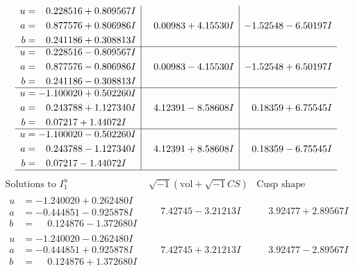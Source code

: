 \documentclass[1p]{elsarticle_modified}
\theoremstyle{definition}
\newcommand{\I}{\sqrt{-1}}
\begin{document}
$$\begin{array}{c|c|c}
\begin{aligned}
u &= \phantom{-}0.228516 + 0.809567 I \\
a &= \phantom{-}0.877576 + 0.806986 I \\
b &= \phantom{-}0.241186 + 0.308813 I\end{aligned}
 & \phantom{-}0.00983 + 4.15530 I & -1.52548 - 6.50197 I \\ \hline\begin{aligned}
u &= \phantom{-}0.228516 - 0.809567 I \\
a &= \phantom{-}0.877576 - 0.806986 I \\
b &= \phantom{-}0.241186 - 0.308813 I\end{aligned}
 & \phantom{-}0.00983 - 4.15530 I & -1.52548 + 6.50197 I \\ \hline\begin{aligned}
u &= -1.100020 + 0.502260 I \\
a &= \phantom{-}0.243788 + 1.127340 I \\
b &= \phantom{-}0.07217 + 1.44072 I\end{aligned}
 & \phantom{-}4.12391 - 8.58608 I & \phantom{-}0.18359 + 6.75545 I \\ \hline\begin{aligned}
u &= -1.100020 - 0.502260 I \\
a &= \phantom{-}0.243788 - 1.127340 I \\
b &= \phantom{-}0.07217 - 1.44072 I\end{aligned}
 & \phantom{-}4.12391 + 8.58608 I & \phantom{-}0.18359 - 6.75545 I\\
 \hline 
 \end{array}$$\newpage$$\begin{array}{c|c|c}  
\text{Solutions to }I^u_{1}& \I (\text{vol} + \sqrt{-1}CS) & \text{Cusp shape}\\
 \hline 
\begin{aligned}
u &= -1.240020 + 0.262480 I \\
a &= -0.444851 - 0.925878 I \\
b &= \phantom{-}0.124876 - 1.372680 I\end{aligned}
 & \phantom{-}7.42745 - 3.21213 I & \phantom{-}3.92477 + 2.89567 I \\ \hline\begin{aligned}
u &= -1.240020 - 0.262480 I \\
a &= -0.444851 + 0.925878 I \\
b &= \phantom{-}0.124876 + 1.372680 I\end{aligned}
 & \phantom{-}7.42745 + 3.21213 I & \phantom{-}3.92477 - 2.89567 I \\ \hline\begin{aligned}

\end{aligned}
\end{array}$$
\end{document}
